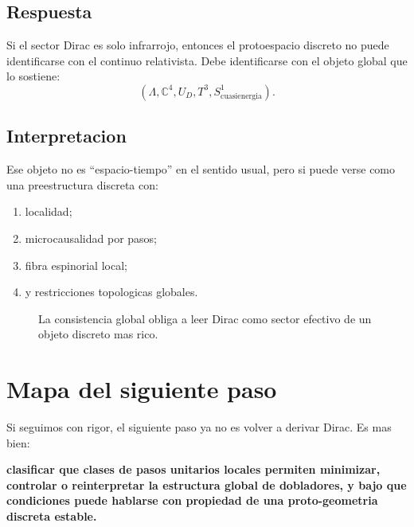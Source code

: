 \subsection{Respuesta}
Si el sector Dirac es solo infrarrojo, entonces el protoespacio discreto no puede identificarse con el continuo relativista. Debe identificarse con el objeto global que lo sostiene:
\begin{equation}
(\Lambda,\mathbb{C}^4,U_D,T^3,S^1_{\text{cuasienergia}}).
\label{c32:eq:globalobject}
\end{equation}

\subsection{Interpretacion}
Ese objeto no es \enquote{espacio-tiempo} en el sentido usual, pero si puede verse como una preestructura discreta con:
\begin{enumerate}[label=\arabic*.]
    \item localidad;
    \item microcausalidad por pasos;
    \item fibra espinorial local;
    \item y restricciones topologicas globales.
\end{enumerate}

\begin{figure}[h!]
\centering
{}
\caption{La consistencia global obliga a leer Dirac como sector efectivo de un objeto discreto mas rico.}
\end{figure}

\section{Mapa del siguiente paso}
Si seguimos con rigor, el siguiente paso ya no es volver a derivar Dirac. Es mas bien:
\begin{displayquote}
\textbf{clasificar que clases de pasos unitarios locales permiten minimizar, controlar o reinterpretar la estructura global de dobladores, y bajo que condiciones puede hablarse con propiedad de una proto-geometria discreta estable.}
\end{displayquote}

